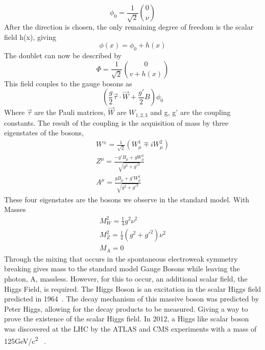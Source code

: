  
\begin{equation}
\phi_{0} = \frac{1}{\sqrt{2}} \binom{0}{\nu}
\end{equation}
After the direction is chosen, the only remaining degree of freedom is the scalar field h(x), giving 
\begin{equation}
\phi(x) = \phi_{0} + h(x)
\end{equation}
The doublet can now be described by 
\begin{equation}
\Phi = \frac{1}{\sqrt{2}} \binom{0}{v+h(x)}
\end{equation}
This field couples to the gauge bosons as 
\begin{equation}
(\frac{g}{2}\overrightarrow{\tau}\cdot \overrightarrow{W} + \frac{g'}{2}B)\phi_{0}
\end{equation}
Where ${\overrightarrow{\tau}}$ are the Pauli matrices, ${\overrightarrow{W}}$ are ${W_{1,2,3}}$ and g, g' are the coupling constants. The result of the coupling is the acquisition of mass by three eigenstates of the bosons, 
\begin{equation}
\begin{split}
W^{\pm} = \frac{1}{\sqrt{2}}(W^{1}_{\mu} \mp iW^{2}_{\mu})\\
Z^{\mu} = \frac{-g'B_{\mu} + gW^{3}_{\mu}}{\sqrt{g^{2} + g'^{2}}}\\
A^{\mu} = \frac{gB_{\mu} + g'W^{3}_{\mu}}{\sqrt{g^{2} + g'^{2}}}
\end{split}
\end{equation}
These four eigenstates are the bosons we observe in the standard model. With Masses
\begin{equation}
\begin{split}
M^{2}_{W} = \frac{1}{4}g^{2}\nu^{2} \\
M^{2}_{Z} = \frac{1}{4}(g^{2} + g'^{2})\nu^{2} \\
M_{A} = 0
\end{split}
\end{equation}
Through the mixing that occurs in the spontaneous electroweak symmetry breaking gives mass to the standard model Gauge Bosons while leaving the photon, A, massless. However, for this to occur, an additional scalar field, the Higgs Field, is required.\newline
\indent The Higgs Boson is an excitation in the scalar Higgs field predicted in 1964~\cite{PhysRevLett.13.508}. The decay mechanism of this massive boson was predicted by Peter Higgs, allowing for the decay products to be measured. Giving a way to prove the existence of the scalar Higgs field. In 2012, a Higgs like scalar boson was discovered at the LHC by the ATLAS and CMS experiments with a mass of 125GeV/c\textsuperscript{2} ~\cite{Aad:2012tfa}.

